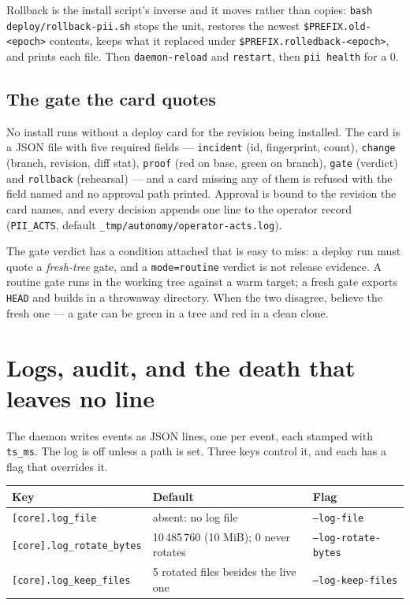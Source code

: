 Rollback is the install script's inverse and it moves rather than copies:
\texttt{bash deploy/rollback-pii.sh} stops the unit, restores the newest
\texttt{\$PREFIX.old-\textless{}epoch\textgreater{}} contents, keeps what it replaced under
\texttt{\$PREFIX.rolledback-\textless{}epoch\textgreater{}}, and prints each file. Then
\texttt{daemon-reload} and \texttt{restart}, then \texttt{pii health} for a 0.

\subsection*{The gate the card quotes}

No install runs without a deploy card for the revision being installed. The card is a JSON
file with five required fields --- \texttt{incident} (id, fingerprint, count),
\texttt{change} (branch, revision, diff stat), \texttt{proof} (red on base, green on
branch), \texttt{gate} (verdict) and \texttt{rollback} (rehearsal) --- and a card missing
any of them is refused with the field named and no approval path printed. Approval is bound
to the revision the card names, and every decision appends one line to the operator record
(\texttt{PII\_ACTS}, default \texttt{\_tmp/autonomy/operator-acts.log}).

The gate verdict has a condition attached that is easy to miss: a deploy run must quote a
\emph{fresh-tree} gate, and a \texttt{mode=routine} verdict is not release evidence. A
routine gate runs in the working tree against a warm target; a fresh gate exports
\texttt{HEAD} and builds in a throwaway directory. When the two disagree, believe the fresh
one --- a gate can be green in a tree and red in a clean clone.

\section{Logs, audit, and the death that leaves no line}

The daemon writes events as JSON lines, one per event, each stamped with \texttt{ts\_ms}.
The log is off unless a path is set. Three keys control it, and each has a flag that
overrides it.

\begin{longtable}{@{}p{}p{}p{}@{}}
	\toprule
	\textbf{Key} & \textbf{Default} & \textbf{Flag} \\
	\midrule
	\endhead
	\texttt{[core].log\_file} & absent: no log file & \texttt{--log-file} \\
	\texttt{[core].log\_rotate\_bytes} & 10\,485\,760 (10 MiB); 0 never rotates &
	\texttt{--log-rotate-bytes} \\
	\texttt{[core].log\_keep\_files} & 5 rotated files besides the live one &
	\texttt{--log-keep-files} \\
	\bottomrule
\end{longtable}

